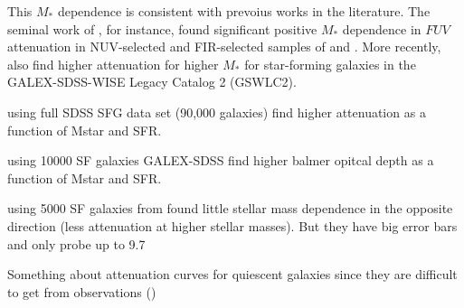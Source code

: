 This $M_*$ dependence is consistent with prevoius works in the literature.
The seminal work of \cite{burgarella2005}, for instance, found significant positive $M_*$ dependence 
in $FUV$ attenuation in NUV-selected and FIR-selected samples of \cite{buat2005}
and \cite{iglesias-paramo2006}. More recently, \cite{salim2018} also find
higher attenuation for higher $M_*$ for star-forming galaxies in the
GALEX-SDSS-WISE Legacy Catalog 2 (GSWLC2).  

\cite{garn2010} using full  SDSS SFG data set (90,000 galaxies)
find higher attenuation as a function of Mstar and SFR.

\cite{battisti2016} using 10000 SF galaxies GALEX-SDSS
find higher balmer opitcal depth as a function of Mstar and SFR.


\cite{battisti2017} using 5000 SF galaxies from 
found little stellar mass dependence in the opposite direction (less
attenuation at higher stellar masses). But they have big error bars and only
probe up to 9.7

Something about attenuation curves for quiescent galaxies since they are
difficult to get from observations ()

